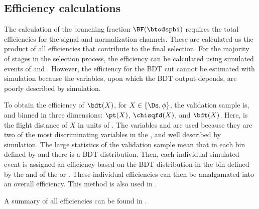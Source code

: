\subsection{Efficiency calculations}
The calculation of the branching fraction $\BF(\btodsphi)$ requires the total efficiencies for the
signal and normalization channels.
These are calculated as the product of all efficiencies that contribute to the final selection.
For the majority of stages in the selection process, the efficiency can be calculated using
simulated events of \btodsphi and \btodsd.
However, the efficiency for the BDT cut cannot be estimated with simulation because the \pid
variables, upon which the BDT output depends, are poorly described by simulation.



To obtain the efficiency of $\bdt(X)$, for $X\in\{\Ds,\phi\}$, the validation sample is, and binned
in three dimensions: $\pt(X)$, $\chisqfd(X)$, and $\bdt(X)$.
Here, \chisqfd is the flight distance of $X$ in units of \chisq.
The variables \pt and \chisqfd are used because they are two of the most discriminating variables
in the \bdt, and well described by simulation.
The large statistics of the validation sample mean that in each bin defined by \pt and \chisqfd
there is a BDT distribution.
Then, each individual simulated event is assigned an efficiency based on the BDT distribution in
the bin defined by the \pt and \chisqfd of the \Ds or \phii.
These individual efficiencies can then be amalgamated into an overall efficiency.
This method is also used in .

A summary of all efficiencies can be found in .


